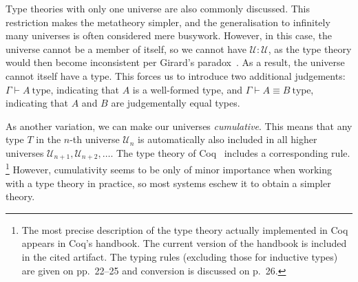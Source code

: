 \documentclass{scrartcl}
\theoremstyle{definition}
\newcommand{\type}{\mathrm{type}}
\newcommand{\Univ}{\mathcal{U}}
\begin{document}
Type theories with only one universe are also commonly discussed.
This restriction makes the metatheory simpler, and the generalisation to infinitely many universes is often considered mere busywork.
However, in this case, the universe cannot be a member of itself, so we cannot have $\Univ : \Univ$, as the type theory would then become inconsistent per Girard's paradox~\cite{girard:thesis}.
As a result, the universe cannot itself have a type.
This forces us to introduce two additional judgements: $Γ ⊢ A~\type$, indicating that $A$ is a well-formed type, and $Γ ⊢ A ≡ B~\type$, indicating that $A$ and $B$ are judgementally equal types.

As another variation, we can make our universes \emph{cumulative}.
This means that any type $T$ in the $n$-th universe $\Univ_{n}$ is automatically also included in all higher universes $\Univ_{n+1}, \Univ_{n+2}, \dots$.
The type theory of Coq~\cite{coq} includes a corresponding rule.%
\footnote{The most precise description of the type theory actually implemented in Coq appears in Coq's handbook.
  The current version of the handbook is included in the cited artifact.
  The typing rules (excluding those for inductive types) are given on pp.\ 22--25 and conversion is discussed on p.\ 26.}
However, cumulativity seems to be only of minor importance when working with a type theory in practice, so most systems eschew it to obtain a simpler theory.


\end{document}

